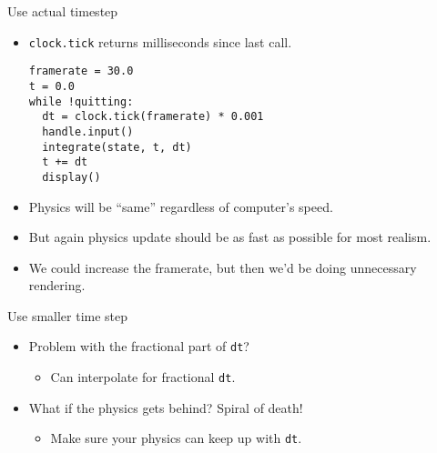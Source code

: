 \documentclass{beamer}
\newcommand{\bframe}[1]{\begin{frame}[fragile]{#1}}
\begin{document}
\bframe{Use actual timestep}
\begin{itemize}
\item {\tt clock.tick} returns milliseconds since last call.
  \begin{Verbatim}[frame=single]
framerate = 30.0
t = 0.0
while !quitting:
  dt = clock.tick(framerate) * 0.001
  handle.input()
  integrate(state, t, dt)
  t += dt       
  display()
  \end{Verbatim}
  \item Physics will be ``same'' regardless of computer's speed.
\item But again physics update should be as fast as possible
  for most realism.
  \item We could increase the framerate, but then we'd be doing
    unnecessary rendering.
\end{itemize}
\end{frame}

\bframe{Use smaller time step}
\begin{itemize}
  \begin{Verbatim}[frame=single]
framerate = 30.0
t = 0.0
dt = 0.01
while !quitting:
  timespan = clock.tick(framerate) * 0.001
  handle.input()
  while (timespan > 0):
    integrate(state, t, dt)
    timespan -= dt
  display()
\end{Verbatim}
\item Problem with the fractional part of {\tt dt}?
  \begin{itemize}  \item Can interpolate for fractional {\tt dt}.
    \end{itemize}
\item What if the physics gets behind?  Spiral of death!
  \begin{itemize}
  \item Make sure your physics can keep up with {\tt dt}.
    \end{itemize}
\end{itemize}
\end{frame}
\end{document}
